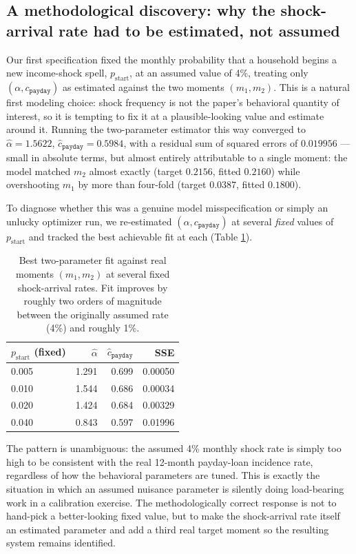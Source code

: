 \documentclass[12pt]{article}
\begin{document}
\subsection{A methodological discovery: why the shock-arrival rate had to be estimated, not assumed}

Our first specification fixed the monthly probability that a household begins a new income-shock spell, $p_{\text{start}}$, at an assumed value of 4\%, treating only $(\alpha, c_{\texttt{payday}})$ as estimated against the two moments $(m_1, m_2)$. This is a natural first modeling choice: shock frequency is not the paper's behavioral quantity of interest, so it is tempting to fix it at a plausible-looking value and estimate around it. Running the two-parameter estimator this way converged to $\hat\alpha = 1.5622$, $\hat c_{\texttt{payday}} = 0.5984$, with a residual sum of squared errors of $0.019956$ — small in absolute terms, but almost entirely attributable to a single moment: the model matched $m_2$ almost exactly (target $0.2156$, fitted $0.2160$) while overshooting $m_1$ by more than four-fold (target $0.0387$, fitted $0.1800$).

To diagnose whether this was a genuine model misspecification or simply an unlucky optimizer run, we re-estimated $(\alpha, c_{\texttt{payday}})$ at several \emph{fixed} values of $p_{\text{start}}$ and tracked the best achievable fit at each (Table \ref{tab:pstart_diagnostic}).

\begin{table}[h]
\centering
\begin{tabular}{@{}lrrr@{}}
\toprule
$p_{\text{start}}$ (fixed) & $\hat\alpha$ & $\hat c_{\texttt{payday}}$ & SSE \\
\midrule
0.005 & 1.291 & 0.699 & 0.00050 \\
0.010 & 1.544 & 0.686 & 0.00034 \\
0.020 & 1.424 & 0.684 & 0.00329 \\
0.040 & 0.843 & 0.597 & 0.01996 \\
\bottomrule
\end{tabular}
\caption{Best two-parameter fit against real moments $(m_1,m_2)$ at several fixed shock-arrival rates. Fit improves by roughly two orders of magnitude between the originally assumed rate (4\%) and roughly 1\%.}
\label{tab:pstart_diagnostic}
\end{table}

The pattern is unambiguous: the assumed 4\% monthly shock rate is simply too high to be consistent with the real 12-month payday-loan incidence rate, regardless of how the behavioral parameters are tuned. This is exactly the situation in which an assumed nuisance parameter is silently doing load-bearing work in a calibration exercise. The methodologically correct response is not to hand-pick a better-looking fixed value, but to make the shock-arrival rate itself an estimated parameter and add a third real target moment so the resulting system remains identified.
\end{document}
